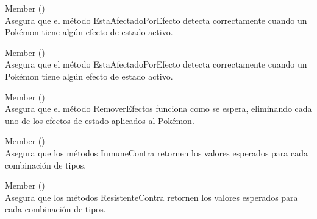 \begin{DoxyRefList}
\item[Member \doxylink{class_ucu_1_1_poo_1_1_discord_bot_1_1_domain_1_1_tests_1_1_tests_general_1_1_test_pokemon_1_1_test_pokemon_aa19e083548f057ee07528dc465eca299}{Ucu.Poo.Discord\+Bot.Domain.Tests.Tests\+General.Test\+Pokemon.Test\+Pokemon.Test\+Esta\+Afectado\+Por\+Efecto} ()]\hfill \\
\label{test__test000003}%
%
 Asegura que el método {\ttfamily Esta\+Afectado\+Por\+Efecto} detecta correctamente cuando un Pokémon tiene algún efecto de estado activo.  
\item[Member \doxylink{class_ucu_1_1_poo_1_1_discord_bot_1_1_domain_1_1_tests_1_1_tests_general_1_1_test_pokemon_1_1_test_pokemon_aa87418b0ea86f7dd52014b413f6fdc66}{Ucu.Poo.Discord\+Bot.Domain.Tests.Tests\+General.Test\+Pokemon.Test\+Pokemon.Test\+Get\+Ataque\+Especial} ()]\hfill \\
\label{test__test000002}%
%
 Asegura que el método {\ttfamily Esta\+Afectado\+Por\+Efecto} detecta correctamente cuando un Pokémon tiene algún efecto de estado activo.  
\item[Member \doxylink{class_ucu_1_1_poo_1_1_discord_bot_1_1_domain_1_1_tests_1_1_tests_general_1_1_test_pokemon_1_1_test_pokemon_ac6dfda07fc70c6c2a615b8391061a9f4}{Ucu.Poo.Discord\+Bot.Domain.Tests.Tests\+General.Test\+Pokemon.Test\+Pokemon.Test\+Remover\+Efectos} ()]\hfill \\
\label{test__test000007}%
%
 Asegura que el método {\ttfamily Remover\+Efectos} funciona como se espera, eliminando cada uno de los efectos de estado aplicados al Pokémon.  
\item[Member \doxylink{class_ucu_1_1_poo_1_1_discord_bot_1_1_domain_1_1_tests_1_1_tests_general_1_1_test_pokemon_1_1_test_pokemon_ad123674e84aa01c500ac0c4f3f8db937}{Ucu.Poo.Discord\+Bot.Domain.Tests.Tests\+General.Test\+Pokemon.Test\+Pokemon.Test\+Tipos\+Inmune\+Contra} ()]\hfill \\
\label{test__test000008}%
%
 Asegura que los métodos Inmune\+Contra retornen los valores esperados para cada combinación de tipos.  
\item[Member \doxylink{class_ucu_1_1_poo_1_1_discord_bot_1_1_domain_1_1_tests_1_1_tests_general_1_1_test_pokemon_1_1_test_pokemon_af135b46be67f90094d7a82c2ce34eec2}{Ucu.Poo.Discord\+Bot.Domain.Tests.Tests\+General.Test\+Pokemon.Test\+Pokemon.Test\+Tipos\+Resistente\+Contra} ()]\hfill \\
\label{test__test000009}%
%
 Asegura que los métodos Resistente\+Contra retornen los valores esperados para cada combinación de tipos. 
\end{DoxyRefList}